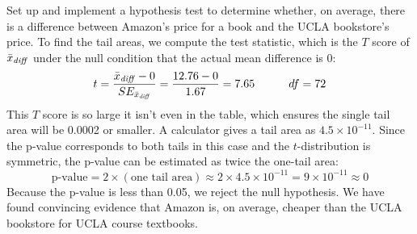 \begin{example}{Set up and implement a hypothesis test to determine whether, on average, there is a difference between Amazon's price for a book and the UCLA bookstore's price.}
To find the tail areas, we compute the test statistic, which is the $T$ score of $\bar{x}_{\text{\emph{diff}}}$ under the null condition that the actual mean difference is 0:
$$t = \frac{\bar{x}_{\text{\emph{diff}}} - 0}{SE_{\bar{x}_{\text{\emph{diff}}}}}= \frac{12.76 - 0}{1.67} = 7.65  \quad \quad \quad df=72$$
This $T$ score is so large it isn't even in the table, which ensures the single tail area will be 0.0002 or smaller. A calculator gives a tail area as $4.5\times 10^{-11}$. Since the p-value corresponds to both tails in this case and the $t$-distribution is symmetric, the p-value can be estimated as twice the one-tail area:
$$\text{p-value} = 2\times (\text{one tail area}) \approx 2\times 4.5\times 10^{-11} = 9\times 10^{-11}\approx 0$$
Because the p-value is less than 0.05, we reject the null hypothesis. We have found convincing evidence that Amazon is, on average, cheaper than the UCLA bookstore for UCLA course textbooks.
\end{example}

\textA{\newpage}

